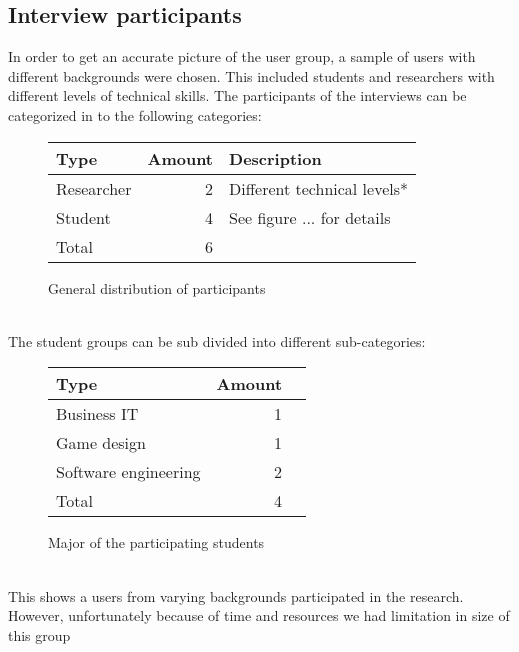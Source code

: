 \documentclass[conference]{IEEEtran}
\begin{document}
	\subsection{Interview participants}
		In order to get an accurate picture of the user group, a sample of users with different backgrounds were chosen. This included students and researchers with different levels of technical skills. The participants of the interviews can be categorized in to the following categories:
		\begin{figure}[ht]
			\centering
			\begin{tabular}{ | l | r | l | }
				\hline
				Type			& Amount	& Description \\ \hline \hline
				Researcher		& 2			& Different technical levels* \\ \hline
				Student			& 4			& See figure ... for details \\ \hline \hline
				Total			& 6			& \\ \hline
			\end{tabular}
			\caption{General distribution of participants}
		\end{figure}\\
		The student groups can be sub divided into different sub-categories:
		\begin{figure}[ht]
			\centering
			\begin{tabular}{ | l | r | l | }
				\hline
				Type					& Amount \\ \hline \hline
				Business IT				& 1 \\ \hline
				Game design				& 1 \\ \hline
				Software engineering	& 2 \\ \hline
				Total					& 4 \\ \hline
			\end{tabular}
			\caption{Major of the participating students}
		\end{figure} \\
		This shows a users from varying backgrounds participated in the research. However, unfortunately because of time and resources we had limitation in size of this group
\end{document}
